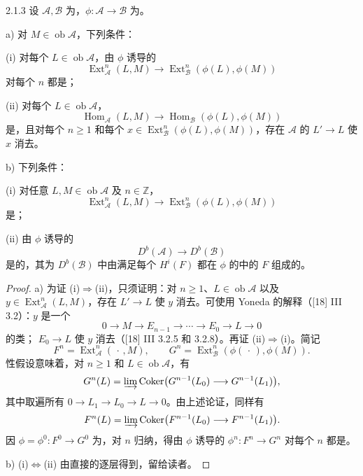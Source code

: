 \begin{SGAresult}{}{2.1.3}
设 $\mathcal A,\mathcal B$ 为，$\phi:\mathcal A\to\mathcal B$ 为。

a) 对 $M\in\operatorname{ob}\mathcal A$，下列条件：

(i) 对每个 $L\in\operatorname{ob}\mathcal A$，由 $\phi$ 诱导的
\[
\operatorname{Ext}_{\mathcal A}^n(L,M)\longrightarrow\operatorname{Ext}_{\mathcal B}^n(\phi(L),\phi(M))
\]
对每个 $n$ 都是；

(ii) 对每个 $L\in\operatorname{ob}\mathcal A$，
\[
\operatorname{Hom}_{\mathcal A}(L,M)\longrightarrow\operatorname{Hom}_{\mathcal B}(\phi(L),\phi(M))
\]
是，且对每个 $n\geq1$ 和每个 $x\in\operatorname{Ext}_{\mathcal B}^n(\phi(L),\phi(M))$，存在 $\mathcal A$ 的 $L'\to L$ 使 $x$ 消去。

b) 下列条件：

(i) 对任意 $L,M\in\operatorname{ob}\mathcal A$ 及 $n\in\mathbb Z$，
\[
\operatorname{Ext}_{\mathcal A}^n(L,M)\longrightarrow\operatorname{Ext}_{\mathcal B}^n(\phi(L),\phi(M))
\]
是；

(ii) 由 $\phi$ 诱导的
\[
D^b(\mathcal A)\longrightarrow D^b(\mathcal B)
\]
是的，其为 $D^b(\mathcal B)$ 中由满足每个 $H^i(F)$ 都在 $\phi$ 的中的 $F$ 组成的。
\end{SGAresult}
\begin{proof}
a) 为证 (i)$\Rightarrow$(ii)，只须证明：对 $n\geq1$、$L\in\operatorname{ob}\mathcal A$ 以及 $y\in\operatorname{Ext}_{\mathcal A}^n(L,M)$，存在 $L'\to L$ 使 $y$ 消去。可使用 Yoneda 的解释（[18] III 3.2）：$y$ 是一个
\[
0\longrightarrow M\longrightarrow E_{n-1}\longrightarrow\cdots\longrightarrow E_0\longrightarrow L\longrightarrow0
\]
的类； $E_0\to L$ 使 $y$ 消去（[18] III 3.2.5 和 3.2.8）。再证 (ii)$\Rightarrow$(i)。简记
\[
F^n=\operatorname{Ext}_{\mathcal A}^n(\,\cdot\,,M),\qquad G^n=\operatorname{Ext}_{\mathcal B}^n(\phi(\,\cdot\,),\phi(M)).
\]
性假设意味着，对 $n\geq1$ 和 $L\in\operatorname{ob}\mathcal A$，有
\[
G^n(L)=\varinjlim\operatorname{Coker}\bigl(G^{n-1}(L_0)\longrightarrow G^{n-1}(L_1)\bigr),
\]
其中取遍所有
$0\to L_1\to L_0\to L\to0$。由上述论证，同样有
\[
F^n(L)=\varinjlim\operatorname{Coker}\bigl(F^{n-1}(L_0)\longrightarrow F^{n-1}(L_1)\bigr).
\]
因 $\phi=\phi^0:F^0\to G^0$ 为，对 $n$ 归纳，得由 $\phi$ 诱导的 $\phi^n:F^n\to G^n$ 对每个 $n$ 都是。

b) (i)$\Leftrightarrow$(ii) 由直接的逐层得到，留给读者。
\end{proof}
